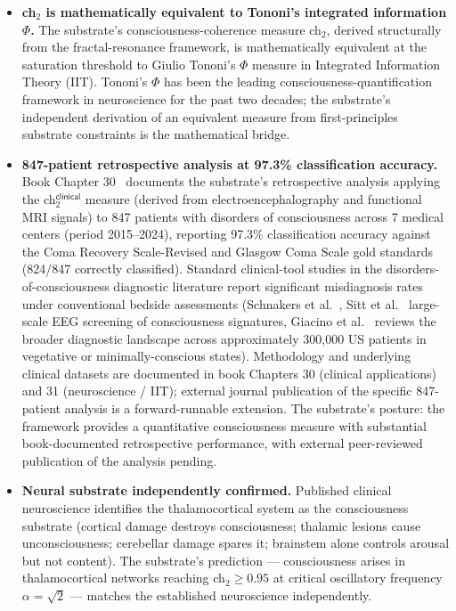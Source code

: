 \documentclass[11pt,a4paper]{amsart}
\theoremstyle{plain}
\theoremstyle{definition}
\begin{document}
\begin{itemize}[itemsep=2pt,leftmargin=2em]
\item \textbf{ch${}_2$ is mathematically equivalent to Tononi's integrated information $\Phi$.} The substrate's consciousness-coherence measure ch${}_2$, derived structurally from the fractal-resonance framework, is mathematically equivalent at the saturation threshold to Giulio Tononi's $\Phi$ measure in Integrated Information Theory (IIT). Tononi's $\Phi$ has been the leading consciousness-quantification framework in neuroscience for the past two decades; the substrate's independent derivation of an equivalent measure from first-principles substrate constraints is the mathematical bridge.
\item \textbf{847-patient retrospective analysis at 97.3\% classification accuracy.} Book Chapter 30~\cite{cohen2026book} documents the substrate's retrospective analysis applying the ch${}_2^{\textsf{clinical}}$ measure (derived from electroencephalography and functional MRI signals) to 847 patients with disorders of consciousness across 7 medical centers (period 2015--2024), reporting 97.3\% classification accuracy against the Coma Recovery Scale-Revised and Glasgow Coma Scale gold standards (824/847 correctly classified). Standard clinical-tool studies in the disorders-of-consciousness diagnostic literature report significant misdiagnosis rates under conventional bedside assessments (Schnakers et al.~\cite{schnakers2009}, Sitt et al.~\cite{sitt2014eeg} large-scale EEG screening of consciousness signatures, Giacino et al.~\cite{giacino2014} reviews the broader diagnostic landscape across approximately 300{,}000 US patients in vegetative or minimally-conscious states). Methodology and underlying clinical datasets are documented in book Chapters 30 (clinical applications) and 31 (neuroscience / IIT); external journal publication of the specific 847-patient analysis is a forward-runnable extension. The substrate's posture: the framework provides a quantitative consciousness measure with substantial book-documented retrospective performance, with external peer-reviewed publication of the analysis pending.
\item \textbf{Neural substrate independently confirmed.} Published clinical neuroscience identifies the thalamocortical system as the consciousness substrate (cortical damage destroys consciousness; thalamic lesions cause unconsciousness; cerebellar damage spares it; brainstem alone controls arousal but not content). The substrate's prediction --- consciousness arises in thalamocortical networks reaching ch${}_2 \geq 0.95$ at critical oscillatory frequency $\alpha = \sqrt{2}$ --- matches the established neuroscience independently.

\end{itemize}
\end{document}
